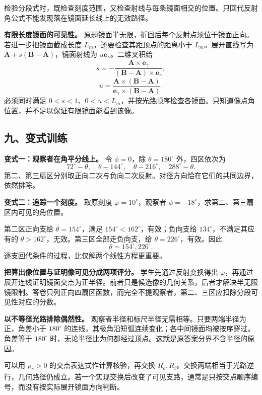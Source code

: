 \documentclass[12pt,a4paper,UTF8]{ctexart}
\begin{document}
检验分段式时，既检查刻度范围，又检查射线与每条镜面相交的位置。只回代反射角公式不能发现落在镜面延长线上的无效路径。

\textbf{有限长度镜面的可见性。}
原题镜面半无限，折回后每个反射点须位于镜面正向。若进一步把镜面截成长度
\(L_m\)，还要检查其距顶点的距离小于 \(L_m\)。展开直线写为
\(\boldsymbol A+s(\boldsymbol B-\boldsymbol A)\)，镜面射线为
\(u\boldsymbol e_\gamma\)。二维叉积给 \[
s=-\frac{\boldsymbol A\times\boldsymbol e_\gamma}
{(\boldsymbol B-\boldsymbol A)\times\boldsymbol e_\gamma},
\] \[
u=\frac{\boldsymbol A\times(\boldsymbol B-\boldsymbol A)}
{\boldsymbol e_\gamma\times(\boldsymbol B-\boldsymbol A)}.
\] 必须同时满足
\(0<s<1\)、\(0<u<L_m\)，并按光路顺序检查各镜面。只知道像点角位置，并不足以保证有限镜面能看到该像。

\subsection{九、变式训练}\label{ux4e5dux53d8ux5f0fux8badux7ec3-5}

\textbf{变式一：观察者在角平分线上。} 令 \(\phi=0\)，除
\(\theta=180^\circ\) 外，四区依次为 \[
\boxed{72^\circ-\theta,\quad
\theta-144^\circ,\quad
\theta-216^\circ,\quad
288^\circ-\theta}.
\]
第二、第三扇区分别取正向二次与负向二次反射。对径方向恰在它们的共同边界，依然排除。

\textbf{变式二：追踪一个刻度。} 取原刻度 \(\varphi=10^\circ\)，观察者
\(\phi=-18^\circ\)，求第二、第三扇区内可见的角位置。

第二区正向支给 \(\theta=154^\circ\)，满足
\(154^\circ<162^\circ\)，有效；负向支给 \(134^\circ\)，不满足其应有的
\(\theta>162^\circ\)，无效。第三区全部走负向支，给
\(\theta=226^\circ\)，有效。因此 \[
\boxed{\theta=154^\circ, 226^\circ}.
\] 逐支回代条件的过程，比仅解两个线性方程更重要。

\textbf{把算出像位置与证明像可见分成两项评分。} 学生先通过反射变换得出
\(\varphi\)，再通过展开连线证明镜面交点为正半径。前者只是候选像的几何关系，后者才解决半无限镜限制。答卷只列正向四扇区函数，而完全不提观察者，第二、三区应扣除分段可见性对应的分数。

\textbf{以不等径光路排除偶然性。}
观察者半径和标尺半径无需相等。只要两端半径为正，角差小于 \(180^\circ\)
的连线，其极角沿短弧连续变化；各中间镜面均被按序穿过。角差等于
\(180^\circ\)
时，无论半径比为何都经过顶点。这就是原答案分界不含半径的原因。

可以用 \(\rho_\gamma>0\) 的交点表达式作计算核验，再交换
\(R_o,R_i\)。交换两端相当于光路逆行，几何路径仍成立。若一个实现交换后改变了可见支路，通常是只按交点顺序编号，而没有按实际展开镜面方向判断。
\end{document}
